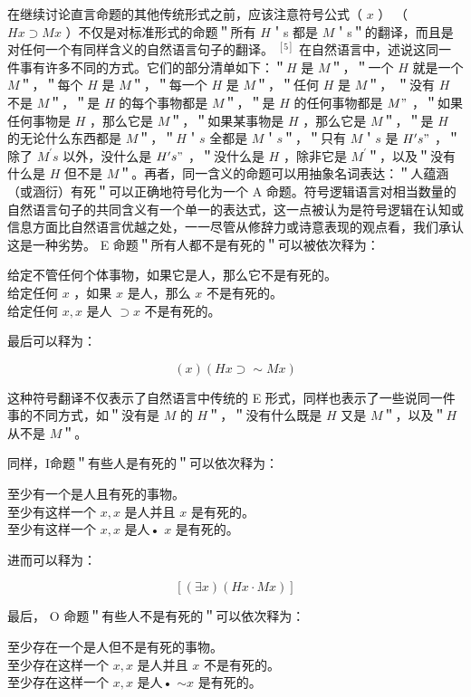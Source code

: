 在继续讨论直言命题的其他传统形式之前，应该注意符号公式（ $x$ ） （ $H x \supset M x$ ）不仅是对标准形式的命题＂所有 $H$＇s 都是 $M$＇s＂的翻译，而且是对任何一个有同样含义的自然语言句子的翻译。 ${ }^{[5]}$ 在自然语言中，述说这同一件事有许多不同的方式。它们的部分清单如下：＂$H$ 是 $M$＂，＂一个 $H$ 就是一个 $M$＂，＂每个 $H$ 是 $M$＂，＂每一个 $H$ 是 $M$＂，＂任何 $H$ 是 $M$＂， ＂没有 $H$ 不是 $M$＂，＂是 $H$ 的每个事物都是 $M$＂，＂是 $H$ 的任何事物都是 $M "$ ，＂如果任何事物是 $H$ ，那么它是 $M$＂，＂如果某事物是 $H$ ，那么它是 $M$＂，＂是 $H$ 的无论什么东西都是 $M$＂，＂$H$＇$s$ 全都是 $M$＇$s$＂，＂只有 $M$＇$s$ 是 $H^{\prime} s "$ ，＂除了 $M^{\prime} s$ 以外，没什么是 $H^{\prime} s "$ ，＂没什么是 $H$ ，除非它是 $M^{\prime}$＂，以及＂没有什么是 $H$ 但不是 $M$＂。再者，同一含义的命题可以用抽象名词表达：＂人蕴涵（或涵衍）有死＂可以正确地符号化为一个 A 命题。符号逻辑语言对相当数量的自然语言句子的共同含义有一个单一的表达式，这一点被认为是符号逻辑在认知或信息方面比自然语言优越之处，一一尽管从修辞力或诗意表现的观点看，我们承认这是一种劣势。 E 命题＂所有人都不是有死的＂可以被依次释为：

\begin{displayquote}
给定不管任何个体事物，如果它是人，那么它不是有死的。\\
给定任何 $x$ ，如果 $x$ 是人，那么 $x$ 不是有死的。\\
给定任何 $x, x$ 是人 $\supset x$ 不是有死的。
\end{displayquote}

最后可以释为：

$$
(x)(H x \supset \sim M x)
$$

这种符号翻译不仅表示了自然语言中传统的 E 形式，同样也表示了一些说同一件事的不同方式，如＂没有是 $M$ 的 $H$＂，＂没有什么既是 $H$ 又是 $M$＂，以及＂$H$ 从不是 $M$＂。

同样，I命题＂有些人是有死的＂可以依次释为：

至少有一个是人且有死的事物。\\
至少有这样一个 $x, x$ 是人并且 $x$ 是有死的。\\
至少有这样一个 $x, x$ 是人• $x$ 是有死的。

进而可以释为：

$$
[(\exists x)(H x \cdot M x)]
$$

最后， O 命题＂有些人不是有死的＂可以依次释为：

至少存在一个是人但不是有死的事物。\\
至少存在这样一个 $x, x$ 是人并且 $x$ 不是有死的。\\
至少存在这样一个 $x, x$ 是人• $\sim x$ 是有死的。

